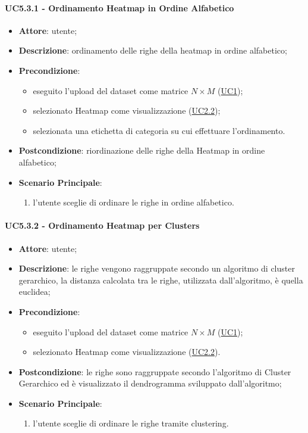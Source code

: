     \paragraph{UC5.3.1 - Ordinamento Heatmap in Ordine Alfabetico}
    \label{uc5.3.1}
    \begin{itemize}
    \item \textbf{Attore}: utente;
    \item \textbf{Descrizione}: ordinamento delle righe della heatmap in ordine alfabetico;
    \item \textbf{Precondizione}: 
    \begin{itemize}
        \item eseguito l'upload del dataset come matrice $N\times M$ (\hyperref[uc1]{UC1});
        \item selezionato Heatmap come visualizzazione (\hyperref[uc2.2]{UC2.2});
        \item selezionata una etichetta di categoria su cui effettuare l'ordinamento.
    \end{itemize}  
    \item \textbf{Postcondizione}: riordinazione delle righe della Heatmap in ordine alfabetico;
    \item \textbf{Scenario Principale}: 
    \begin{enumerate}
        \item l'utente sceglie di ordinare le righe in ordine alfabetico.
    \end{enumerate}  
    \end{itemize}
    
    \paragraph{UC5.3.2 - Ordinamento Heatmap per Clusters}
    \label{uc5.3.2}
    \begin{itemize}
    \item \textbf{Attore}: utente;
    \item \textbf{Descrizione}: le righe vengono raggruppate secondo un algoritmo di cluster gerarchico, la distanza calcolata  tra le righe, utilizzata dall'algoritmo, è quella euclidea;
    \item \textbf{Precondizione}: 
    \begin{itemize}
        \item eseguito l'upload del dataset come matrice $N\times M$ (\hyperref[uc1]{UC1});
        \item selezionato Heatmap come visualizzazione (\hyperref[uc2.2]{UC2.2}).
    \end{itemize}  
    \item \textbf{Postcondizione}: le righe sono raggruppate secondo l'algoritmo di Cluster Gerarchico ed è visualizzato il dendrogramma sviluppato dall'algoritmo;
    \item \textbf{Scenario Principale}: 
    \begin{enumerate}
        \item l'utente sceglie di ordinare le righe tramite clustering.
    \end{enumerate}  
    \end{itemize}
    
